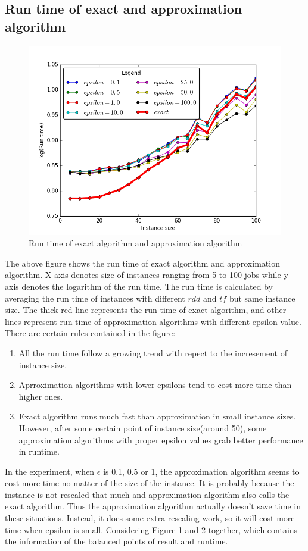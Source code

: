 \documentclass[11pt]{article}
\begin{document}
\subsection{Run time of exact and approximation algorithm}
\begin{figure}[H]
  \centering
    \label{fig:runtime} %
    \includegraphics[width=1\textwidth]{runtime.png}
\caption{Run time of exact algorithm and approximation algorithm}
\end{figure}
The above figure shows the run time of exact algorithm and approximation algorithm. X-axis denotes size of instances ranging from 5 to 100 jobs while y-axis denotes the logarithm of the run time. The run time is calculated by averaging the run time of instances with different $rdd$ and $tf$ but same instance size. The thick red line represents the run time of exact algorithm, and other lines represent run time of approximation algorithms with different epsilon value.\\
There are certain rules contained in the figure:
\begin{enumerate}
\item All the run time follow a growing trend with repect to the incresement of instance size.
\item Aprroximation algorithms with lower epsilons tend to cost more time than higher ones.
\item Exact algorithm runs much fast than approximation in small instance sizes. However, after some certain point of instance size(around 50), some approximation algorithms with proper epsilon values grab better performance in runtime.
\end{enumerate}
In the experiment, when $\epsilon$ is 0.1, 0.5 or 1, the approximation algorithm seems to cost more time no matter of the size of the instance. It is probably because the instance is not rescaled that much and approximation algorithm also calls the exact algorithm. Thus the approximation algorithm actually doesn't save time in these situations. Instead, it does some extra rescaling work, so it will cost more time when epsilon is small. Considering Figure 1 and 2 together, which contains the information of the balanced points of result and runtime.
\end{document}
